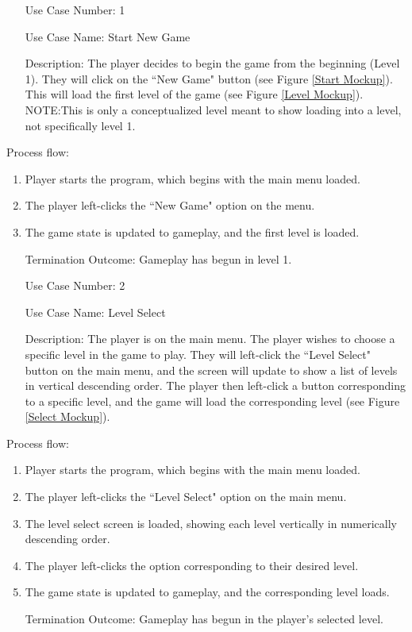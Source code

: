\documentclass[10pt,conference,onecolumn,compsoc]{IEEEtran}
\begin{document}
\begin{itemize}
\item[Use Case Number:] 1
\item[Use Case Name:] Start New Game
\item[Description:] The player decides to begin the game from the beginning (Level 1). They will click on the ``New Game" button (see Figure \ref{Start Mockup}). This will load the first level of the game (see Figure \ref{Level Mockup}). NOTE:This is only a conceptualized level meant to show loading into a level, not specifically level 1.
\end{itemize}

Process flow:

\begin{enumerate}
\item Player starts the program, which begins with the main menu loaded.
\item The player left-clicks the ``New Game" option on the menu.
\item The game state is updated to gameplay, and the first level is loaded.
\item[Termination Outcome:] Gameplay has begun in level 1.
\end{enumerate}

\begin{itemize}
\item[Use Case Number:] 2
\item[Use Case Name:] Level Select
\item[Description:] The player is on the main menu. The player wishes to choose a specific level in the game to play. They will left-click the ``Level Select" button on the main menu, and the screen will update to show a list of levels in vertical descending order. The player then left-click a button corresponding to a specific level, and the game will load the corresponding level (see Figure \ref{Select Mockup}).
\end{itemize}

Process flow:

\begin{enumerate}
\item Player starts the program, which begins with the main menu loaded.
\item The player left-clicks the ``Level Select" option on the main menu.
\item The level select screen is loaded, showing each level vertically in numerically descending order.
\item The player left-clicks the option corresponding to their desired level.
\item The game state is updated to gameplay, and the corresponding level loads.
\item[Termination Outcome:] Gameplay has begun in the player's selected level.
\end{enumerate}
\end{document}
